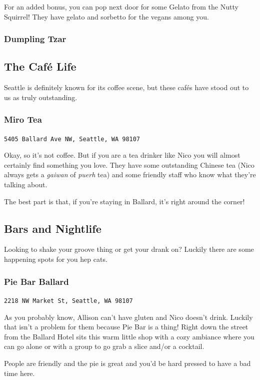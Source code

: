 \documentclass[10pt]{article}
\begin{document}
For an added bonus, you can pop next door for some Gelato from the Nutty Squirrel! They 
have gelato and sorbetto for the vegans among you.

\subsubsection{Dumpling Tzar}

\subsection{The Caf\'e Life}
Seattle is definitely known for its coffee scene, but these caf\'es have stood out to us as truly outstanding.
\subsubsection{Miro Tea}
\begin{center}
    \texttt{5405 Ballard Ave NW, Seattle, WA 98107}
\end{center}

Okay, so it's not coffee. But if you are a tea drinker like Nico you will almost certainly
find something you love. They have some outstanding Chinese tea (Nico always gets a \textit{gaiwan} of \textit{puerh} tea)
and some friendly staff who know what they're talking about.

The best part is that, if you're staying in Ballard, it's right around the corner!

\subsection{Bars and Nightlife}
Looking to shake your groove thing or get your drank on? Luckily there are some happening
spots for you hep cats.
\subsubsection{Pie Bar Ballard}
\begin{center}
    \texttt{2218 NW Market St, Seattle, WA 98107}
\end{center}

As you probably know, Allison can't have gluten and Nico doesn't drink. Luckily that isn't a problem 
for them because Pie Bar is a thing! Right down the street from the Ballard Hotel sits this warm
little shop with a cozy ambiance where you can go alone or with a group to go grab a slice and/or a cocktail.

People are friendly and the pie is great and you'd be hard pressed to have a bad time here.
\end{document}
